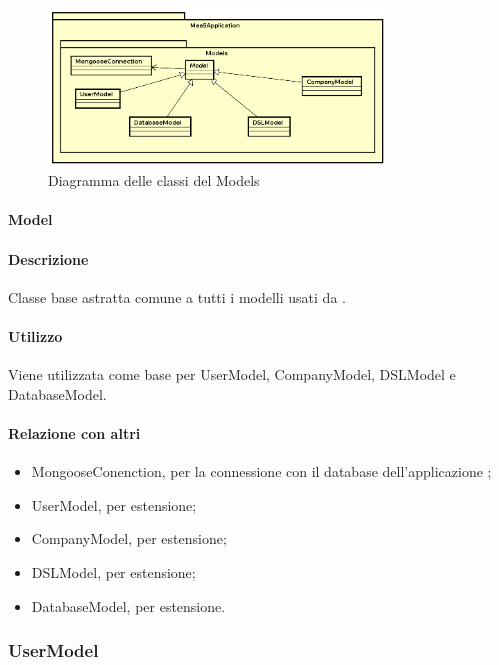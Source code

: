 \begin{figure}[H]
\centering
\includegraphics[width=0.8\textwidth]{res/sections/backend/models.png}
\caption{Diagramma delle classi del  Models}
\end{figure}

\paragraph{Model}
\paragraph*{Descrizione}
Classe base astratta comune a tutti i modelli usati da .

\paragraph*{Utilizzo}
Viene utilizzata come base per UserModel, CompanyModel, DSLModel e DatabaseModel.

\paragraph*{Relazione con altri }
\begin{itemize}
\item MongooseConenction, per la connessione con il database  dell'applicazione ;
\item UserModel, per estensione;
\item CompanyModel, per estensione;
\item DSLModel, per estensione;
\item DatabaseModel, per estensione.
\end{itemize}

\subsubsection{UserModel}
